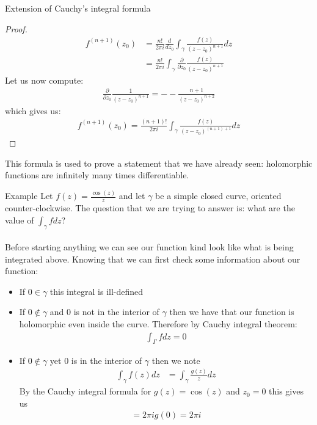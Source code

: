 \begin{parag}{Extension of Cauchy's integral formula}
\begin{proof}
		\begin{align*} 
			f^{\left(n + 1\right)}\left(z_0\right) &= \frac{n!}{2\pi i} \frac{d}{dz_0} \int_{\gamma} \frac{f\left(z\right)}{\left(z - z_0\right)^{n + 1}}dz\\
												   &= \frac{n!}{2\pi i}\int_{\gamma} \frac{\partial }{\partial z_0} \frac{f\left(z\right)}{\left(z - z_0\right)^{n+1}}
		\end{align*}
		Let us now compute:
		\begin{align*} 
			\frac{\partial }{\partial z_0} \frac{1}{\left(z - z_0\right)^{n+1}} = - - \frac{n + 1}{\left(z - z_0\right)^{n + 2}}
		\end{align*}
		which gives us:
		\begin{align*} 
			f^{\left(n+1\right)}\left(z_0\right) = \frac{\left(n + 1\right)!}{2\pi i} \int_{\gamma} \frac{f\left(z\right)}{\left(z - z_0\right)^{\left(n + 1\right) + 1}}dz
		\end{align*}
	\end{proof}
\end{parag}
\begin{framedremark}
	This formula is used to prove a statement that we have already seen: holomorphic functions are infinitely many times differentiable.
\end{framedremark}
\begin{parag}{Example}
    Let $f\left(z\right) = \frac{\cos\left(z\right)}{z}$ and let $\gamma$ be a simple closed curve, oriented counter-clockwise. The question that we are trying to answer is: what are the value of $\int_{\gamma}fdz$?\\
	$ $\\
	Before starting anything we can see our function kind look like what is being integrated above. Knowing that we can first check some information about our function:
	\begin{itemize}
	    \item If $0 \in \gamma$ this integral is ill-defined
	    \item If $0 \notin \gamma$ and $0$ is not in the interior of $\gamma$ then we have that our function is holomorphic even inside the curve. Therefore by Cauchy integral theorem:
			\begin{align*} 
				\int_{\Gamma} fdz = 0
			\end{align*}
			\item If $0 \notin \gamma$ yet $0$ is in the interior of $\gamma$ then we note
				\begin{align*} 
					\int_{\gamma} f\left(z\right)dz &= \int_{\gamma}\frac{g\left(z\right)}{z} dz
				\end{align*}
				By the Cauchy integral formula for $g\left(z\right) =  \cos\left(z\right)$ and $z_0 = 0$ this gives us 
				\begin{align*} = 2\pi i g\left(0\right) =  2\pi i \end{align*}
	\end{itemize}
\end{parag}
